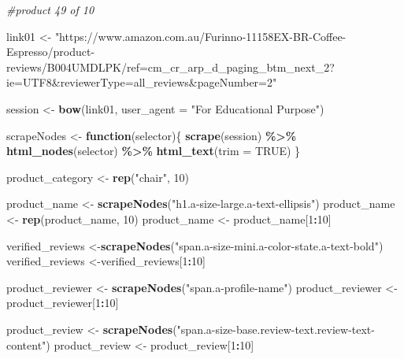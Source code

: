 \documentclass[
]{article}
\newenvironment{Shaded}{\begin{snugshade}}{\end{snugshade}}
\newcommand{\AttributeTok}[1]{\textcolor[rgb]{0.13,0.29,0.53}{#1}}
\newcommand{\CommentTok}[1]{\textcolor[rgb]{0.56,0.35,0.01}{\textit{#1}}}
\newcommand{\ConstantTok}[1]{\textcolor[rgb]{0.56,0.35,0.01}{#1}}
\newcommand{\ControlFlowTok}[1]{\textcolor[rgb]{0.13,0.29,0.53}{\textbf{#1}}}
\newcommand{\DecValTok}[1]{\textcolor[rgb]{0.00,0.00,0.81}{#1}}
\newcommand{\FunctionTok}[1]{\textcolor[rgb]{0.13,0.29,0.53}{\textbf{#1}}}
\newcommand{\NormalTok}[1]{#1}
\newcommand{\OtherTok}[1]{\textcolor[rgb]{0.56,0.35,0.01}{#1}}
\newcommand{\SpecialCharTok}[1]{\textcolor[rgb]{0.81,0.36,0.00}{\textbf{#1}}}
\newcommand{\StringTok}[1]{\textcolor[rgb]{0.31,0.60,0.02}{#1}}
\begin{document}
\begin{Shaded}
\begin{Highlighting}[]
\CommentTok{\#product 49 of 10}

\NormalTok{link01 }\OtherTok{\textless{}{-}} \StringTok{"https://www.amazon.com.au/Furinno{-}11158EX{-}BR{-}Coffee{-}Espresso/product{-}reviews/B004UMDLPK/ref=cm\_cr\_arp\_d\_paging\_btm\_next\_2?ie=UTF8\&reviewerType=all\_reviews\&pageNumber=2"}


\NormalTok{  session }\OtherTok{\textless{}{-}} \FunctionTok{bow}\NormalTok{(link01,}
               \AttributeTok{user\_agent =} \StringTok{"For Educational Purpose"}\NormalTok{)}

\NormalTok{  scrapeNodes }\OtherTok{\textless{}{-}} \ControlFlowTok{function}\NormalTok{(selector)\{}
    \FunctionTok{scrape}\NormalTok{(session) }\SpecialCharTok{\%\textgreater{}\%}
      \FunctionTok{html\_nodes}\NormalTok{(selector) }\SpecialCharTok{\%\textgreater{}\%}
      \FunctionTok{html\_text}\NormalTok{(}\AttributeTok{trim =} \ConstantTok{TRUE}\NormalTok{)}
\NormalTok{  \}}

\NormalTok{  product\_category }\OtherTok{\textless{}{-}} \FunctionTok{rep}\NormalTok{(}\StringTok{"chair"}\NormalTok{, }\DecValTok{10}\NormalTok{)}

\NormalTok{  product\_name }\OtherTok{\textless{}{-}} \FunctionTok{scrapeNodes}\NormalTok{(}\StringTok{"h1.a{-}size{-}large.a{-}text{-}ellipsis"}\NormalTok{)}
\NormalTok{  product\_name }\OtherTok{\textless{}{-}} \FunctionTok{rep}\NormalTok{(product\_name, }\DecValTok{10}\NormalTok{)}
\NormalTok{  product\_name }\OtherTok{\textless{}{-}}\NormalTok{ product\_name[}\DecValTok{1}\SpecialCharTok{:}\DecValTok{10}\NormalTok{]}
  
\NormalTok{  verified\_reviews }\OtherTok{\textless{}{-}}\FunctionTok{scrapeNodes}\NormalTok{(}\StringTok{"span.a{-}size{-}mini.a{-}color{-}state.a{-}text{-}bold"}\NormalTok{)}
\NormalTok{  verified\_reviews }\OtherTok{\textless{}{-}}\NormalTok{verified\_reviews[}\DecValTok{1}\SpecialCharTok{:}\DecValTok{10}\NormalTok{]}
  
\NormalTok{  product\_reviewer }\OtherTok{\textless{}{-}} \FunctionTok{scrapeNodes}\NormalTok{(}\StringTok{"span.a{-}profile{-}name"}\NormalTok{)}
\NormalTok{  product\_reviewer }\OtherTok{\textless{}{-}}\NormalTok{ product\_reviewer[}\DecValTok{1}\SpecialCharTok{:}\DecValTok{10}\NormalTok{]}
  
\NormalTok{  product\_review }\OtherTok{\textless{}{-}} \FunctionTok{scrapeNodes}\NormalTok{(}\StringTok{"span.a{-}size{-}base.review{-}text.review{-}text{-}content"}\NormalTok{)}
\NormalTok{  product\_review }\OtherTok{\textless{}{-}}\NormalTok{ product\_review[}\DecValTok{1}\SpecialCharTok{:}\DecValTok{10}\NormalTok{]}
  

\end{Highlighting}
\end{Shaded}
\end{document}
